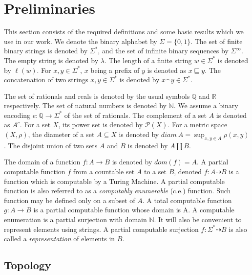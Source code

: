 \documentclass[a4paper,UKenglish,autoref,thm-restate,numberwithinsect]{lipics-v2021}
\newcommand{\N}{\mathbb{N}}
\begin{document}
\section{Preliminaries}\label{sec:prerequisites}

This section consists of the required definitions and some basic results which we use in our work. We denote the binary alphabet by $\Sigma=\{0,1\}$. The set of finite binary strings is denoted by $\Sigma^*$, and the set of infinite binary sequences by $\Sigma^\infty$. The empty string is denoted by $\lambda$. The length of a finite string $w\in\Sigma^*$ is denoted by $\ell(w)$. For $x,y\in\Sigma^*$, $x$ being a prefix of $y$ is denoted as $x\sqsubseteq y$. The concatenation of two strings $x,y\in\Sigma^*$ is denoted by $x^\frown y\in\Sigma^*$. 

The set of rationals and reals is denoted by the usual symbols $\mathbb{Q}$ and $\mathbb{R}$ respectively. The set of natural numbers is denoted by $\mathbb{N}$. We assume a binary encoding $e:\mathbb{Q}\to\Sigma^*$ of the set of rationals. The complement of a set $A$ is denoted as $A^c$. For a set $X$, its power set is denoted by $\mathcal{P}(X)$. For a metric space $(X,\rho)$, the diameter of a set $A\subseteq X$ is denoted by $diam\ A=\sup_{x,y\in A}\rho(x,y)$. The disjoint union of two sets $A$ and $B$ is denoted by $A\coprod B$. 

The domain of a function $f:A\to B$ is denoted by $dom(f)=A$. A partial computable function $f$ from a countable set $A$ to a set $B$, denoted $f:A\dashrightarrow B$ is a function which is computable by a Turing Machine. A partial computable function is also referred to as a \textit{computably enumerable} (c.e.) function. Such function may be defined only on a subset of $A$. A total computable function $g:A \to B$ is a partial computable function whose domain is A. A computable enumeration is a partial surjection with domain $\N$. It will also be convenient to represent elements using strings. A partial computable surjection $f: \Sigma^* \dashrightarrow B$ is also called a \emph{representation} of elements in $B$. 

\subsection{Topology}
\end{document}
